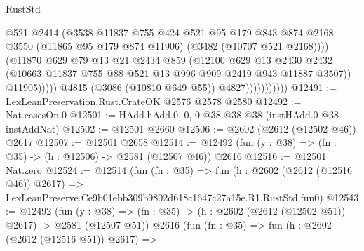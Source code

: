 \begin{lexlean}{RustStd}
\begin{coremodule}
                                    @521
                                    @2414
                                    (@3538
                                      @11837
                                      @755
                                      @424
                                      @521
                                      @95
                                      @179
                                      @843
                                      @874
                                      @2168
                                      @3550
                                      (@11865 @95 @179 @874 @11906)
                                      (@3482 (@10707 @521 @2168))))
                                  (@11870
                                    @629
                                    @79
                                    @13
                                    @21
                                    @2434
                                    @859
                                    (@12100
                                      @629
                                      @13
                                      @2430
                                      @2432
                                      (@10663
                                        @11837
                                        @755
                                        @88
                                        @521
                                        @13
                                        @996
                                        @909
                                        @2419
                                        @943
                                        @11887
                                        @3507))
                                    @11905)))))
                          @4815
                          (@3086 (@10810 @649 @55))
                          @4827)))))))))))
@12491 := LexLeanPreservation.Rust.CrateOK @2576 @2578 @2580
@12492 := Nat.casesOn.{0}
@12501 := HAdd.hAdd.{0, 0, 0} @38 @38 @38 (instHAdd.{0} @38 instAddNat)
@12502 := @12501 @2660
@12506 := @2602 (@2612 (@12502 @46)) @2617
@12507 := @12501 @2658
@12514 := @12492 (fun (y : @38) => (fn : @35) -> (h : @12506) -> @2581 (@12507 @46)) @2616
@12516 := @12501 Nat.zero
@12524 := @12514
    (fun (fn : @35) =>
    fun (h : @2602 (@2612 (@12516 @46)) @2617) =>
    LexLeanPreserve.Ce9b01ebb309b9802d618c1647c27a15e.R1.RustStd.fun0)
@12543 := @12492
    (fun (y : @38) => (fn : @35) -> (h : @2602 (@2612 (@12502 @51)) @2617) -> @2581 (@12507 @51))
    @2616
    (fun (fn : @35) =>
    fun (h : @2602 (@2612 (@12516 @51)) @2617) =>

\end{coremodule}
\end{lexlean}

